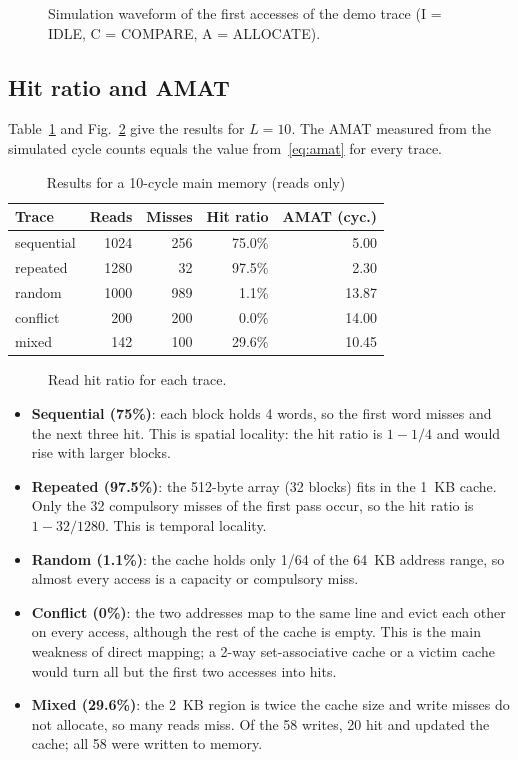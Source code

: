 \documentclass[conference]{IEEEtran}
\begin{document}
\begin{figure}[t]
\centering
\resizebox{0.9\textwidth}{!}{}
\caption{Simulation waveform of the first accesses of the demo trace (I = IDLE, C = COMPARE, A = ALLOCATE).}
\label{fig:wave}
\end{figure}

\subsection{Hit ratio and AMAT}
Table~\ref{tab:results} and Fig.~\ref{fig:hit} give the results for $L = 10$. The AMAT measured from the
simulated cycle counts equals the value from~\eqref{eq:amat} for every trace.

\begin{table}[h]
\centering
\caption{Results for a 10-cycle main memory (reads only)}
\label{tab:results}
\begin{tabular}{lrrrr}
\toprule
Trace & Reads & Misses & Hit ratio & AMAT (cyc.) \\
\midrule
sequential & 1024 & 256 & 75.0\% & 5.00 \\
repeated   & 1280 & 32  & 97.5\% & 2.30 \\
random     & 1000 & 989 & 1.1\%  & 13.87 \\
conflict   & 200  & 200 & 0.0\%  & 14.00 \\
mixed      & 142  & 100 & 29.6\% & 10.45 \\
\bottomrule
\end{tabular}
\end{table}

\begin{figure}[t]
\centering

\caption{Read hit ratio for each trace.}
\label{fig:hit}
\end{figure}

\begin{itemize}
\item \textbf{Sequential (75\%)}: each block holds 4 words, so the first word misses and the next three hit. This is
spatial locality: the hit ratio is $1 - 1/4$ and would rise with larger blocks.
\item \textbf{Repeated (97.5\%)}: the 512-byte array (32 blocks) fits in the 1~KB cache. Only the 32 compulsory misses
of the first pass occur, so the hit ratio is $1 - 32/1280$. This is temporal locality.
\item \textbf{Random (1.1\%)}: the cache holds only 1/64 of the 64~KB address range, so almost every access is a
capacity or compulsory miss.
\item \textbf{Conflict (0\%)}: the two addresses map to the same line and evict each other on every access, although
the rest of the cache is empty. This is the main weakness of direct mapping; a 2-way set-associative cache or a
victim cache~\cite{jouppi1990} would turn all but the first two accesses into hits.
\item \textbf{Mixed (29.6\%)}: the 2~KB region is twice the cache size and write misses do not allocate, so many
reads miss. Of the 58 writes, 20 hit and updated the cache; all 58 were written to memory.
\end{itemize}
\end{document}
